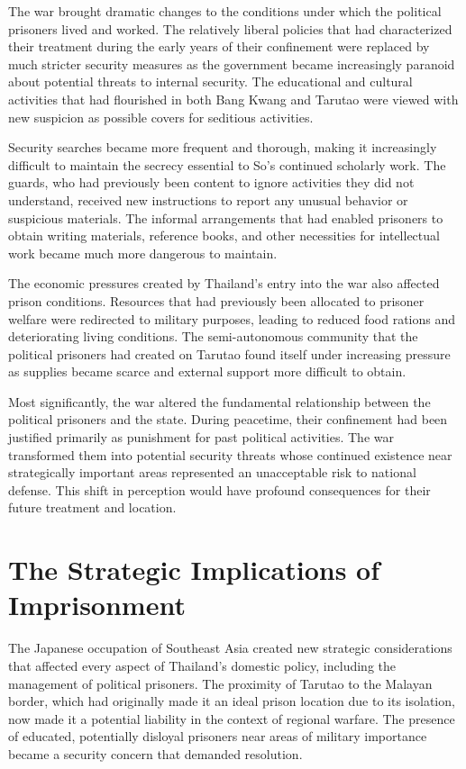 \documentclass[
  Letterpaper,
]{scrbook}
\begin{document}
The war brought dramatic changes to the conditions under which the
political prisoners lived and worked. The relatively liberal policies
that had characterized their treatment during the early years of their
confinement were replaced by much stricter security measures as the
government became increasingly paranoid about potential threats to
internal security. The educational and cultural activities that had
flourished in both Bang Kwang and Tarutao were viewed with new suspicion
as possible covers for seditious activities.

Security searches became more frequent and thorough, making it
increasingly difficult to maintain the secrecy essential to So's
continued scholarly work. The guards, who had previously been content to
ignore activities they did not understand, received new instructions to
report any unusual behavior or suspicious materials. The informal
arrangements that had enabled prisoners to obtain writing materials,
reference books, and other necessities for intellectual work became much
more dangerous to maintain.

The economic pressures created by Thailand's entry into the war also
affected prison conditions. Resources that had previously been allocated
to prisoner welfare were redirected to military purposes, leading to
reduced food rations and deteriorating living conditions. The
semi-autonomous community that the political prisoners had created on
Tarutao found itself under increasing pressure as supplies became scarce
and external support more difficult to obtain.

Most significantly, the war altered the fundamental relationship between
the political prisoners and the state. During peacetime, their
confinement had been justified primarily as punishment for past
political activities. The war transformed them into potential security
threats whose continued existence near strategically important areas
represented an unacceptable risk to national defense. This shift in
perception would have profound consequences for their future treatment
and location.

\section{The Strategic Implications of
Imprisonment}\label{the-strategic-implications-of-imprisonment}

The Japanese occupation of Southeast Asia created new strategic
considerations that affected every aspect of Thailand's domestic policy,
including the management of political prisoners. The proximity of
Tarutao to the Malayan border, which had originally made it an ideal
prison location due to its isolation, now made it a potential liability
in the context of regional warfare. The presence of educated,
potentially disloyal prisoners near areas of military importance became
a security concern that demanded resolution.
\end{document}
